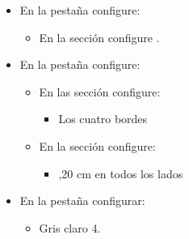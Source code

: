 \documentclass[letterpaper,10pt,spanish]{sphinxmanual}
\begin{document}
\begin{enumerate}
\begin{itemize}
\begin{itemize}
\begin{itemize}
\item {} 
\sphinxAtStartPar
Después del texto: 4cm

\end{itemize}

\item {} 
\sphinxAtStartPar
En la sección  configure:
\begin{itemize}
\item {} 
\sphinxAtStartPar
Sobre el párrafo: 2cm

\end{itemize}

\end{itemize}

\item {} 
\sphinxAtStartPar
En la pestaña  configure:
\begin{itemize}
\item {} 
\sphinxAtStartPar
En la sección  configure .

\end{itemize}

\item {} 
\sphinxAtStartPar
En la pestaña  configure:
\begin{itemize}
\item {} 
\sphinxAtStartPar
En las sección  configure:
\begin{itemize}
\item {} 
\sphinxAtStartPar
{} Los cuatro bordes

\end{itemize}

\item {} 
\sphinxAtStartPar
En la sección  configure:
\begin{itemize}
\item {} 
,20 cm en todos los lados

\end{itemize}

\end{itemize}

\item {} 
\sphinxAtStartPar
En la pestaña  configurar:
\begin{itemize}
\item {} 
\sphinxAtStartPar
{} Gris claro 4.


\end{itemize}
\end{itemize}
\end{enumerate}
\end{document}

